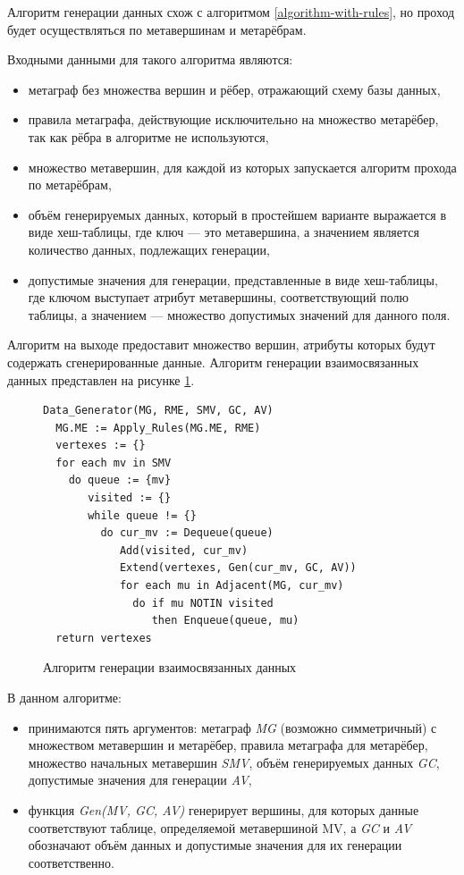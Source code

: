 Алгоритм генерации данных схож с алгоритмом \ref{algorithm-with-rules}, но проход будет осуществляться по метавершинам и метарёбрам.

Входными данными для такого алгоритма являются:
\begin{itemize}
  \item метаграф без множества вершин и рёбер, отражающий схему базы данных,
  \item правила метаграфа, действующие исключительно на множество метарёбер, так как рёбра в алгоритме не используются,
  \item множество метавершин, для каждой из которых запускается алгоритм прохода по метарёбрам,
  \item объём генерируемых данных, который в простейшем варианте выражается в виде хеш-таблицы, где ключ — это метавершина, а значением является количество данных, подлежащих генерации,
  \item допустимые значения для генерации, представленные в виде хеш-таблицы, где ключом выступает атрибут метавершины, соответствующий полю таблицы, а значением — множество допустимых значений для данного поля.
\end{itemize}

Алгоритм на выходе предоставит множество вершин, атрибуты которых будут содержать сгенерированные данные. Алгоритм генерации взаимосвязанных данных представлен на рисунке \ref{algorithm-data-gen}.

\begin{figure}
  \begin{lstlisting}
Data_Generator(MG, RME, SMV, GC, AV)
  MG.ME := Apply_Rules(MG.ME, RME)
  vertexes := {}
  for each mv in SMV
    do queue := {mv}
       visited := {}
       while queue != {}
         do cur_mv := Dequeue(queue)
            Add(visited, cur_mv)
            Extend(vertexes, Gen(cur_mv, GC, AV))
            for each mu in Adjacent(MG, cur_mv)
              do if mu NOTIN visited
                 then Enqueue(queue, mu)
  return vertexes
  \end{lstlisting}
  \caption{Алгоритм генерации взаимосвязанных данных}
  \label{algorithm-data-gen}
\end{figure}

В данном алгоритме:
\begin{itemize}
  \item принимаются пять аргументов: метаграф \textit{MG} (возможно симметричный) с множеством метавершин и метарёбер, правила метаграфа для метарёбер, множество начальных метавершин \textit{SMV}, объём генерируемых данных \textit{GC}, допустимые значения для генерации \textit{AV},
  \item функция \textit{Gen(MV, GC, AV)} генерирует вершины, для которых данные соответствуют таблице, определяемой метавершиной MV, а \textit{GC} и \textit{AV} обозначают объём данных и допустимые значения для их генерации соответственно.
\end{itemize}

